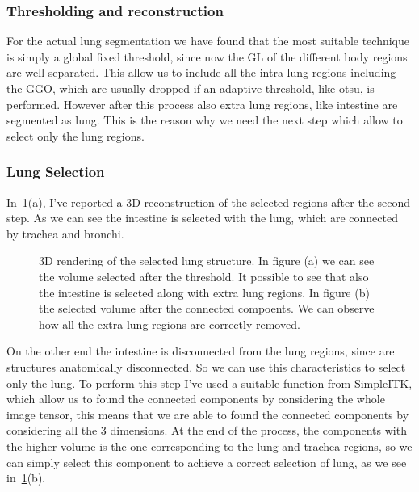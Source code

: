 \documentclass{standalone}
\begin{document}
	

	\subsubsection*{Thresholding and reconstruction}
	
	For the actual lung segmentation we have found that the most suitable technique is simply a global fixed threshold, since now the GL of the different body regions are well separated. This allow us to include all the intra-lung regions including the GGO, which are usually dropped if an adaptive threshold, like otsu, is performed.
	However after this process  also extra lung regions, like intestine are segmented as lung. This is the reason why we need the next step which allow to select only the lung regions.
	
	\subsubsection*{Lung Selection}
	
	In \figurename\,\ref{fig:lungSelection}(a), I've reported a 3D reconstruction of the selected regions after the second step. As we can see the intestine is selected with the lung, which are connected by trachea and bronchi. 
	
	
	
	\begin{figure}[h!]
		\centering
		\label{fig:lungSelection}\caption{3D rendering of the selected lung structure. In figure (a) we can see the volume selected after the threshold. It possible to see that also the intestine is selected along with extra lung regions. In figure (b) the selected volume after the connected compoents. We can observe how all the extra lung regions are correctly removed.} 
	\end{figure}
	
	On the other end the intestine is disconnected from the lung regions, since are structures anatomically disconnected. So we can use this characteristics to select only the lung. To perform this step I've used a suitable function from SimpleITK, which allow us to found the connected components by considering the whole image tensor, this means that we are able to found the connected components by considering all the 3 dimensions. At the end of the process, the components with the higher volume is the one corresponding to the lung and trachea regions, so we can simply select this component to achieve a correct selection of lung, as we see in \figurename\,\ref{fig:lungSelection}(b).
	
\end{document}
